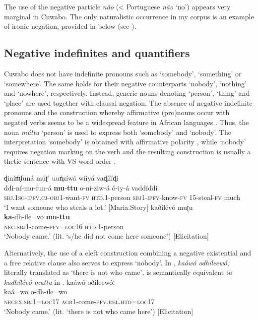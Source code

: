 \documentclass[output=paper,colorlinks=true, citecolor=brown,draftmode]{langscibook}
\begin{document}
The use of the negative particle \textit{não} (< Portuguese \textit{não} ‘no’) appears very marginal in Cuwabo. The only naturalistic occurrence in my corpus is an example of ironic negation, provided in  below (see ).

\subsection{Negative indefinites and quantifiers}\label{sec:cuw:3.2}
Cuwabo does not have indefinite pronouns such as ‘somebody’, ‘something’ or ‘somewhere’. The same holds for their negative counterparts ‘nobody’, ‘nothing’ and ‘nowhere’, respectively. Instead, generic nouns denoting ‘person’, ‘thing’ and ‘place’ are used together with clausal negation. The absence of negative indefinite pronouns and the construction whereby affirmative (pro)nouns occur with negated verbs seems to be a widespread feature in African languages \citep[2]{Cyffer2009}. Thus, the noun \textit{múttu} ‘person’ is used to express both ‘somebody’ and ‘nobody’. The interpretation ‘somebody’ is obtained with affirmative polarity , while ‘nobody’ requires negation marking on the verb and the resulting construction is usually a thetic sentence with VS word order . 

\ea\label{ex:cuw:57} 
    \ea\label{ex:cuw:57a} ɖiníḿ̩funá múʈ’ uuń̩zíwá wííyá vaɖíííɖi\\ 
        \gll ddi-ní-mu-fun-á \textbf{mu}{}-\textbf{ttu} o-ní-ziw-á ó-iy-á vaddíddi \\
              \textsc{sbj.1sg}{}-\textsc{ipfv.cj-obj}1-want-\textsc{fv} \textsc{htd.1}{}-person \textsc{sbj1}-\textsc{ipfv}{}-know-\textsc{fv} \textsc{15}{}-steal-\textsc{fv} much  \\
        \glt  ‘I want someone who steals a lot.’ [Maria.Story]
    \ex\label{ex:cuw:57b} kaðílévó muʈu \\
        \gll  \textbf{ka}{}-dh-íle=vo \textbf{mu}{}-\textbf{ttu}\\
               \textsc{neg.sbj1}-come-\textsc{pfv=loc16} \textsc{htd.1}{}-person\\
        \glt  ‘Nobody came.’ (lit. ‘s/he did not come here someone’) [Elicitation]
    \z
\z  

Alternatively, the use of a cleft construction combining a negative existential and a free relative clause also serves to express ‘nobody’. In , \textit{kaáwó odhileewó}, literally translated as ‘there is not who came’, is semantically equivalent to \textit{kadhílévó muttu} in . 
\newpage
\ea\label{ex:cuw:58} kaáwó oðileewóː \\ 
    \gll kaá=wo o-dh-ile=wo \\
           \textsc{negex.sbj1}=\textsc{loc17} \textsc{agr}1-come-\textsc{pfv.rel.htd}=\textsc{loc17}\\
    \glt  ‘Nobody came.’ (lit. ‘there is not who came here’) [Elicitation]
\z 
\end{document}
